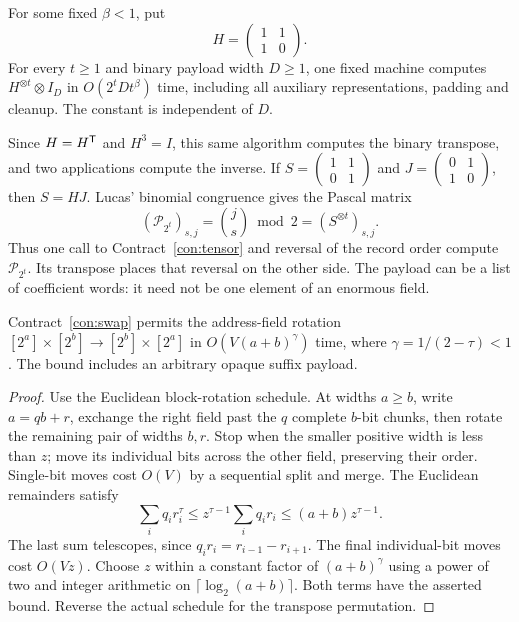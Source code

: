 \begin{contract}\label{con:tensor}
For some fixed $\beta<1$, put
\[
 H=\begin{pmatrix}1&1\\1&0\end{pmatrix}.
\]
For every $t\geq1$ and binary payload width $D\geq1$, one fixed machine
computes $H^{\otimes t}\otimes I_D$ in $O(2^tDt^\beta)$ time,
including all auxiliary representations, padding and cleanup. The
constant is independent of $D$.
\end{contract}
Since $H=H^{\mathsf T}$ and $H^3=I$, this same algorithm computes the binary
transpose, and two applications compute the inverse. If
$S=\left(\begin{smallmatrix}1&1\\0&1\end{smallmatrix}\right)$ and
$J=\left(\begin{smallmatrix}0&1\\1&0\end{smallmatrix}\right)$,
then $S=HJ$. Lucas' binomial congruence gives the Pascal matrix
\[
 (\mathcal P_{2^t})_{s,j}=\binom js\bmod2
       = (S^{\otimes t})_{s,j}.
\]
Thus one call to Contract~\ref{con:tensor} and reversal of the record
order compute $\mathcal P_{2^t}$. Its transpose places that reversal on
the other side. The payload can be a list of coefficient words: it
need not be one element of an enormous field.

\begin{lemma}\label{lem:rectangle}
Contract~\ref{con:swap} permits the address-field rotation
$[2^a]\times[2^b]\to[2^b]\times[2^a]$ in
$O(V(a+b)^\gamma)$ time, where $\gamma=1/(2-\tau)<1$.
The bound includes an arbitrary opaque suffix payload.
\end{lemma}
\begin{proof}
Use the Euclidean block-rotation schedule. At widths $a\geq b$,
write $a=qb+r$, exchange the right field past the $q$ complete
$b$-bit chunks, then rotate the remaining pair of widths $b,r$.
Stop when the smaller positive width is less than $z$; move its
individual bits across the other field, preserving their order.
Single-bit moves cost $O(V)$ by a sequential split and merge.
The Euclidean remainders satisfy
\[
 \sum_i q_i r_i^\tau
 \leq z^{\tau-1}\sum_i q_i r_i
 \leq(a+b)z^{\tau-1}.
\]
The last sum telescopes, since $q_i r_i=r_{i-1}-r_{i+1}$.
The final individual-bit moves cost $O(Vz)$. Choose $z$ within a
constant factor of $(a+b)^\gamma$ using a power of two and integer
arithmetic on $\lceil\log_2(a+b)\rceil$. Both terms have the asserted
bound. Reverse the actual schedule for the transpose permutation.
\end{proof}

